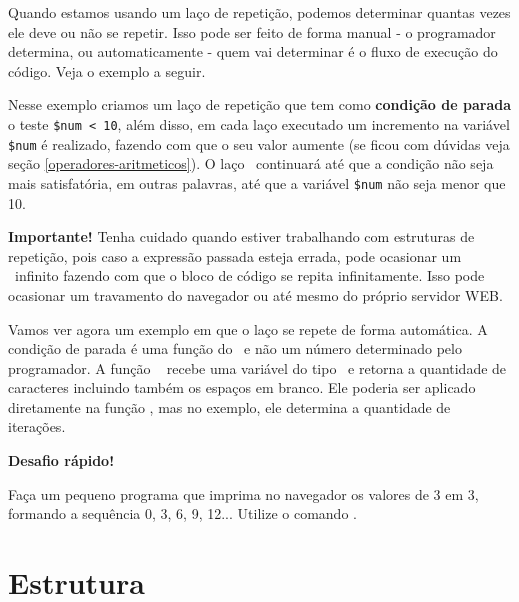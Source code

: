 Quando estamos usando um laço de repetição, podemos determinar quantas vezes ele deve 
ou não se repetir. Isso pode ser feito de forma manual - o programador determina, 
ou automaticamente - quem vai determinar é o fluxo de execução do código. Veja o exemplo
a seguir.



Nesse exemplo criamos um laço de repetição que tem como \textbf{condição de parada} o 
teste \texttt{\$num < 10}, além disso, em cada laço executado um incremento 
na variável \texttt{\$num} é realizado, fazendo com que o seu valor aumente 
(se ficou com dúvidas veja seção \ref{operadores-aritmeticos}). O laço 
\comandowhile~continuará até que a condição não seja mais satisfatória, 
em outras palavras, até que a variável \texttt{\$num} não seja menor que 10.


\begin{framed}
\textbf{{\Large Importante!}}
Tenha cuidado quando estiver trabalhando com estruturas de repetição, pois caso a expressão 
passada esteja errada, pode ocasionar um \lacoloop~infinito fazendo com que o bloco de 
código se repita infinitamente. Isso pode ocasionar um travamento do navegador ou 
até mesmo do próprio servidor WEB.
\end{framed}

Vamos ver agora um exemplo em que o laço se repete de forma automática. A condição de parada 
é uma função do \php~e não um número determinado pelo programador. A função \comandostrlen~
recebe uma variável do tipo \tipostring~e retorna a quantidade de caracteres incluindo 
também os espaços em branco. Ele poderia ser aplicado diretamente na função \funcaoecho, 
mas no exemplo, ele determina a quantidade de iterações. 



\begin{framed}
\textbf{{\Large Desafio rápido!}}

Faça um pequeno programa que imprima no navegador os valores de 3 em 3, formando
a sequência 0, 3, 6, 9, 12... Utilize o comando \comandowhile. 

\end{framed}

\section{Estrutura \comandodowhile}
\label{estrutura-do-while}

